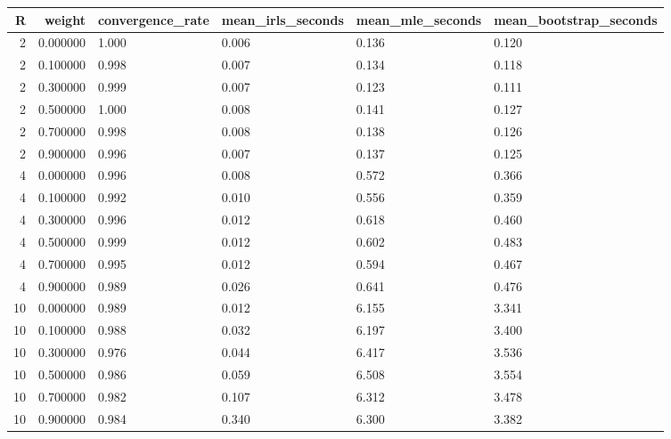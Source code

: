 \begin{tabular}{rrllll}
\toprule
R & weight & convergence\_rate & mean\_irls\_seconds & mean\_mle\_seconds & mean\_bootstrap\_seconds \\
\midrule
2 & 0.000000 & 1.000 & 0.006 & 0.136 & 0.120 \\
2 & 0.100000 & 0.998 & 0.007 & 0.134 & 0.118 \\
2 & 0.300000 & 0.999 & 0.007 & 0.123 & 0.111 \\
2 & 0.500000 & 1.000 & 0.008 & 0.141 & 0.127 \\
2 & 0.700000 & 0.998 & 0.008 & 0.138 & 0.126 \\
2 & 0.900000 & 0.996 & 0.007 & 0.137 & 0.125 \\
4 & 0.000000 & 0.996 & 0.008 & 0.572 & 0.366 \\
4 & 0.100000 & 0.992 & 0.010 & 0.556 & 0.359 \\
4 & 0.300000 & 0.996 & 0.012 & 0.618 & 0.460 \\
4 & 0.500000 & 0.999 & 0.012 & 0.602 & 0.483 \\
4 & 0.700000 & 0.995 & 0.012 & 0.594 & 0.467 \\
4 & 0.900000 & 0.989 & 0.026 & 0.641 & 0.476 \\
10 & 0.000000 & 0.989 & 0.012 & 6.155 & 3.341 \\
10 & 0.100000 & 0.988 & 0.032 & 6.197 & 3.400 \\
10 & 0.300000 & 0.976 & 0.044 & 6.417 & 3.536 \\
10 & 0.500000 & 0.986 & 0.059 & 6.508 & 3.554 \\
10 & 0.700000 & 0.982 & 0.107 & 6.312 & 3.478 \\
10 & 0.900000 & 0.984 & 0.340 & 6.300 & 3.382 \\
\bottomrule
\end{tabular}
